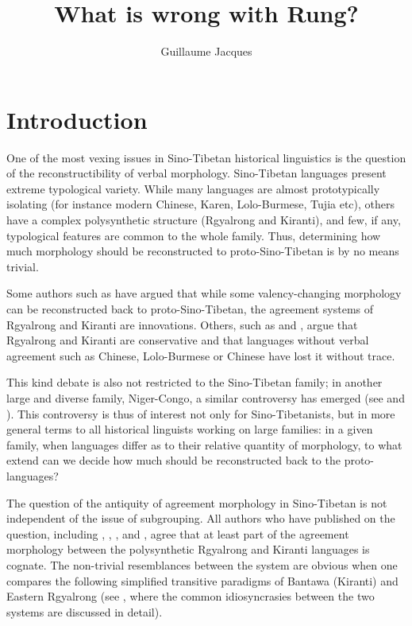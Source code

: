 \documentclass[oldfontcommands,oneside,a4paper,11pt]{article}
\begin{document}
 


\title{What is wrong with Rung?}
\author{Guillaume Jacques}
\maketitle

\section{Introduction}
One of the most vexing issues in Sino-Tibetan historical linguistics is the question of the reconstructibility of verbal morphology. Sino-Tibetan languages present extreme  typological variety. While many  languages are almost prototypically isolating (for instance modern Chinese, Karen, Lolo-Burmese, Tujia etc), others  have a complex polysynthetic structure (Rgyalrong and Kiranti), and few, if any, typological features are common to the whole family. Thus, determining   how much morphology should be reconstructed to proto-Sino-Tibetan is by no means trivial. 

Some authors such as  \citet{lapolla03} have argued that while some valency-changing morphology can be reconstructed back to proto-Sino-Tibetan, the agreement systems of Rgyalrong and Kiranti are innovations. Others, such as  \citet{driem93agreement}  and \citet{delancey10agreement}, argue that Rgyalrong and Kiranti are conservative and that languages without verbal agreement such as Chinese, Lolo-Burmese or Chinese have lost it without trace.
 
This kind debate is also not restricted to the Sino-Tibetan family; in another large and diverse family, Niger-Congo, a similar controversy has emerged (see  \citealt{guldeman08macrosudan} and  \citealt{hyman11macrosudan}).  This controversy is thus of   interest not only for Sino-Tibetanists, but in more general terms to all historical linguists working on large families: in a given family,  when languages differ as to their relative quantity of morphology, to what extend can we decide how much should be reconstructed back to the proto-languages?

The question of the antiquity of agreement morphology in Sino-Tibetan is not independent of the issue of subgrouping. All authors who have published on the question, including  \citet{ebert90rung}, \citet{driem93agreement}, \citet{lapolla03}, \citet{delancey10agreement} and \citet{jacques12agreement}, agree that at least part of the agreement morphology between the polysynthetic Rgyalrong and Kiranti languages is cognate. The non-trivial resemblances between the system are obvious when one compares  the following simplified transitive paradigms of Bantawa (Kiranti) and Eastern Rgyalrong (see \citealt{jacques12agreement}, where the common idiosyncrasies between the two systems are discussed in detail). 
\end{document}
